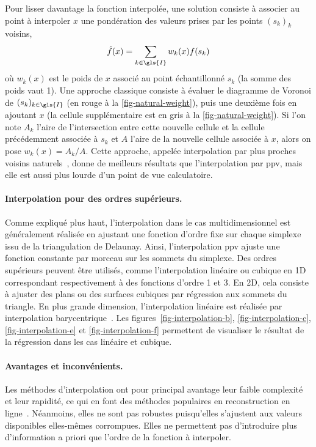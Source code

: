 Pour lisser davantage la fonction interpolée, une solution consiste à associer au point à interpoler $x$ une pondération des valeurs prises par les points $(s_k)_k$ voisins, \ie\
\begin{equation}\label{eq-weighted-interp}
    \hat{f}(x) = \sum_{k\in\gls{I}} w_k(x) f(s_k)
\end{equation}%
\noindent où $w_k(x)$ est le poids de $x$ associé au point échantillonné $s_k$ (la somme des poids vaut 1). Une approche classique consiste à évaluer le diagramme de Voronoi de $(s_k)_{k\in\gls{I}}$ (en rouge à la \cref{fig-natural-weight}), puis une deuxième fois en ajoutant $x$ (la cellule supplémentaire est en gris à la \cref{fig-natural-weight}). Si l'on note $A_k$ l'aire de l'intersection entre cette nouvelle cellule et la cellule précédemment associée à $s_k$ et $A$ l'aire de la nouvelle cellule associée à $x$, alors on pose $w_k(x)=A_k/A$. Cette approche, appelée interpolation par plus proches voisins naturels~\cite{sibson1981interpreting,cazals2006delaunay}, donne de meilleurs résultats que l'interpolation par \gls{ppv}, mais elle est aussi plus lourde d'un point de vue calculatoire.


\paragraph{Interpolation pour des ordres supérieurs.} Comme expliqué plus haut, l'interpolation dans le cas multidimensionnel est généralement réalisée en ajustant une fonction d'ordre fixe sur chaque simplexe issu de la triangulation de Delaunay. Ainsi, l'interpolation \gls{ppv} ajuste une fonction constante par morceau sur les sommets du simplexe. Des ordres supérieurs peuvent être utilisés, comme l'interpolation linéaire ou cubique en 1D correspondant respectivement à des fonctions d'ordre 1 et 3. En 2D, cela consiste à ajuster des plans ou des surfaces cubiques par régression aux sommets du triangle. En plus grande dimension, l'interpolation linéaire est réalisée par interpolation barycentrique~\cite{hormann2014barycentric}. Les figures~\ref{fig-interpolation-b}, \ref{fig-interpolation-c}, \ref{fig-interpolation-e} et \ref{fig-interpolation-f} permettent de visualiser le résultat de la régression dans les cas linéaire et cubique.

\paragraph{Avantages et inconvénients.} Les méthodes d'interpolation ont pour principal avantage leur faible complexité et leur rapidité, ce qui en font des méthodes populaires en reconstruction en ligne~\cite{sibson1981interpreting, cazals2006delaunay, trampert2018ultramicroscopy}. Néanmoins, elles ne sont pas robustes puisqu'elles s'ajustent aux valeurs disponibles elles-mêmes corrompues. Elles ne permettent pas d'introduire plus d'information a priori que l'ordre de la fonction à interpoler.
  
